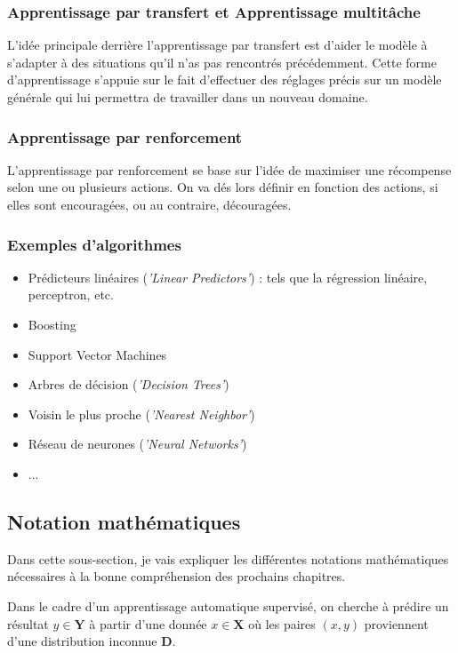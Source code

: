 \documentclass[a4paper]{article}
\begin{document}
\subsubsection{Apprentissage par transfert et Apprentissage multitâche}
L'idée principale derrière l'apprentissage par transfert est d'aider le modèle à s'adapter à des situations qu'il n'as pas rencontrés précédemment. Cette forme d'apprentissage s'appuie sur le fait d'effectuer des réglages précis sur un modèle générale qui lui permettra de travailler dans un nouveau domaine.

\newpage

\subsubsection{Apprentissage par renforcement}
L'apprentissage par renforcement se base sur l'idée de maximiser une récompense selon une ou plusieurs actions. On va dés lors définir en fonction des actions, si elles sont encouragées, ou au contraire, découragées.

\subsubsection{Exemples d'algorithmes}

\begin{itemize}
	\item Prédicteurs linéaires (\textit{'Linear Predictors'}) : tels que la régression linéaire, perceptron, etc.
	\item Boosting
	\item Support Vector Machines
	\item Arbres de décision (\textit{'Decision Trees'})
	\item Voisin le plus proche (\textit{'Nearest Neighbor'})
	\item Réseau de neurones (\textit{'Neural Networks'})
	\item ...
\end{itemize}

\newpage

\subsection{Notation mathématiques}
Dans cette sous-section, je vais expliquer les différentes notations mathématiques nécessaires à la bonne compréhension des prochains chapitres. \newline

Dans le cadre d'un apprentissage automatique supervisé, on cherche à prédire un résultat $y\in \bm{Y}$ à partir d'une donnée $x \in \bm{X}$ où les paires $(x,y)$ proviennent d'une distribution inconnue $\bm{D}$. \newline
\end{document}
